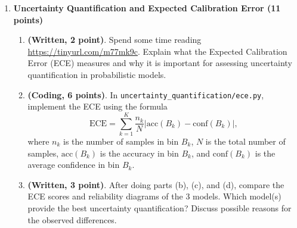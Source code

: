 \documentclass[
  letterpaper,
  numbers=noenddot,
  DIV=11]{scrreprt}
\theoremstyle{plain}
\theoremstyle{definition}
\theoremstyle{remark}
\begin{document}
\begin{enumerate}
\def\labelenumi{(\alph{enumi})}
\item
  \textbf{Uncertainty Quantification and Expected Calibration Error (11
  points)}

  \begin{enumerate}
  \def\labelenumii{(\roman{enumii})}
  \item
    \textbf{(Written, 2 point)}. Spend some time reading
    \url{https://tinyurl.com/m77mk9c}. Explain what the Expected
    Calibration Error (ECE) measures and why it is important for
    assessing uncertainty quantification in probabilistic models.
  \item
    \textbf{(Coding, 6 points)}. In
    \texttt{uncertainty\_quantification/ece.py}, implement the ECE using
    the formula
    \[\text{ECE} = \sum_{k=1}^K \frac{n_k}{N} \left| \text{acc}(B_k) - \text{conf}(B_k) \right|,\]
    where \(n_k\) is the number of samples in bin \(B_k\), \(N\) is the
    total number of samples, \(\text{acc}(B_k)\) is the accuracy in bin
    \(B_k\), and \(\text{conf}(B_k)\) is the average confidence in bin
    \(B_k\).
  \item
    \textbf{(Written, 3 point)}. After doing parts (b), (c), and (d),
    compare the ECE scores and reliability diagrams of the 3 models.
    Which model(s) provide the best uncertainty quantification? Discuss
    possible reasons for the observed differences.
  \end{enumerate}
\end{enumerate}
\end{document}
